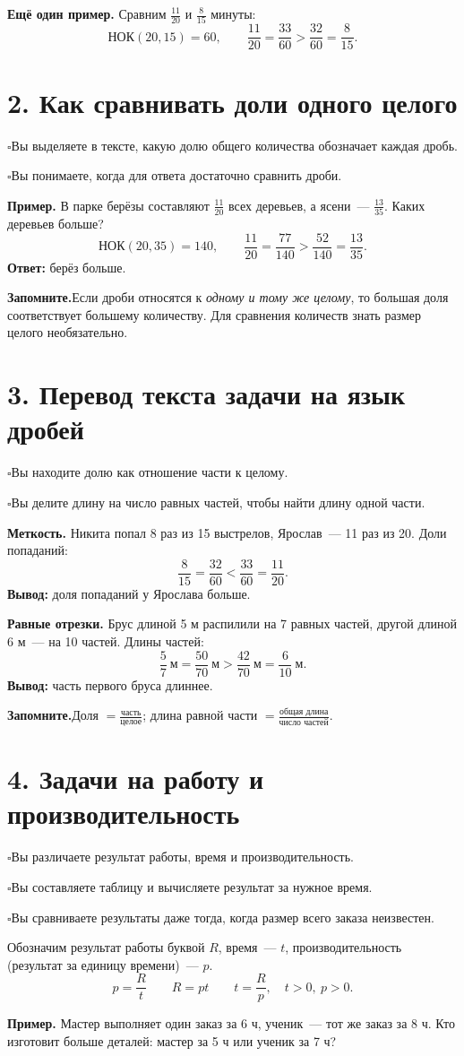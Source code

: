 \documentclass[a4paper,12pt]{article}
\newcommand{\sectionline}[1]{\section*{\color{darkaccent}#1}}
\newcommand{\learn}[1]{\par\noindent$\square$\enspace #1\par}
\newcommand{\keyidea}[1]{\par\noindent\textcolor{darkaccent}{\textbf{Запомните.}}\enspace #1\par}
\begin{document}
\textbf{Ещё один пример.} Сравним $\frac{11}{20}$ и $\frac8{15}$ минуты:
\[
\text{НОК}(20,15)=60,\qquad
\frac{11}{20}=\frac{33}{60}>\frac{32}{60}=\frac8{15}.
\]

\sectionline{2. Как сравнивать доли одного целого}
\learn{Вы выделяете в тексте, какую долю общего количества обозначает каждая дробь.}
\learn{Вы понимаете, когда для ответа достаточно сравнить дроби.}

\textbf{Пример.} В парке берёзы составляют $\frac{11}{20}$ всех деревьев, а ясени~--- $\frac{13}{35}$. Каких деревьев больше?
\[
\text{НОК}(20,35)=140,\qquad
\frac{11}{20}=\frac{77}{140}>\frac{52}{140}=\frac{13}{35}.
\]
\textbf{Ответ:} берёз больше.

\keyidea{Если дроби относятся к \emph{одному и тому же целому}, то большая доля соответствует большему количеству. Для сравнения количеств знать размер целого необязательно.}

\sectionline{3. Перевод текста задачи на язык дробей}
\learn{Вы находите долю как отношение части к целому.}
\learn{Вы делите длину на число равных частей, чтобы найти длину одной части.}

\textbf{Меткость.} Никита попал 8 раз из 15 выстрелов, Ярослав~--- 11 раз из 20. Доли попаданий:
\[
\frac8{15}=\frac{32}{60}<\frac{33}{60}=\frac{11}{20}.
\]
\textbf{Вывод:} доля попаданий у Ярослава больше.

\textbf{Равные отрезки.} Брус длиной 5 м распилили на 7 равных частей, другой длиной 6 м~--- на 10 частей. Длины частей:
\[
\frac57\ \text{м}=\frac{50}{70}\ \text{м}>
\frac{42}{70}\ \text{м}=\frac6{10}\ \text{м}.
\]
\textbf{Вывод:} часть первого бруса длиннее.

\keyidea{Доля $=\frac{\text{часть}}{\text{целое}}$; длина равной части $=\frac{\text{общая длина}}{\text{число частей}}$.}

\sectionline{4. Задачи на работу и производительность}
\learn{Вы различаете результат работы, время и производительность.}
\learn{Вы составляете таблицу и вычисляете результат за нужное время.}
\learn{Вы сравниваете результаты даже тогда, когда размер всего заказа неизвестен.}

Обозначим результат работы буквой $R$, время~--- $t$, производительность (результат за единицу времени)~--- $p$.
\[
\boxed{p=\frac Rt}\qquad
\boxed{R=pt}\qquad
\boxed{t=\frac Rp},
\quad t>0,\ p>0.
\]

\textbf{Пример.} Мастер выполняет один заказ за 6 ч, ученик~--- тот же заказ за 8 ч. Кто изготовит больше деталей: мастер за 5 ч или ученик за 7 ч?
\end{document}

